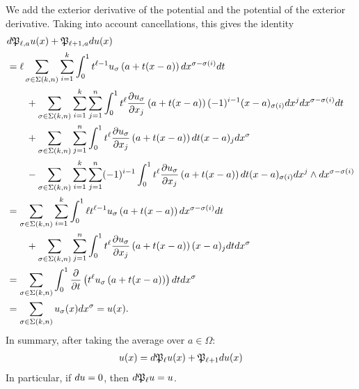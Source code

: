 \documentclass[12pt,a4paper]{article}
\begin{document}
We add the exterior derivative of the potential and the potential of the exterior derivative.
Taking into account cancellations, this gives the identity 
\begin{align*}
    &
    d {\mathfrak P}_{\ell,a} u(x)
    +
    {\mathfrak P}_{\ell+1,a} d u(x)
    \\&
    =
    \ell
    \sum_{\sigma \in \Sigma(k,n)} \sum_{i=1}^{k}
    \int_{0}^{1} 
    t^{\ell-1} u_{\sigma}\left(a+t(x-a)\right) dx^{\sigma-\sigma(i)} dt 
    \\&\qquad
    + 
    \sum_{\sigma \in \Sigma(k,n)} \sum_{i=1}^{k} \sum_{j=1}^{n}
    \int_{0}^{1} 
    t^{\ell} \frac{ \partial u_{\sigma} }{\partial x_{j}}\left(a+t(x-a)\right) (-1)^{i-1} (x-a)_{\sigma(i) } dx^{j} dx^{\sigma-\sigma(i)} dt 
    \\&\qquad
    +
    \sum_{\sigma \in \Sigma(k,n)} \sum_{j=1}^{n}
    \int_{0}^{1} t^{\ell} \frac{ \partial u_{\sigma} }{\partial x_{j}}\left(a+t(x-a)\right) dt (x-a)_{j}
    dx^{\sigma}
    \\&\qquad
    - 
    \sum_{\sigma \in \Sigma(k,n)} \sum_{i=1}^{k} \sum_{j=1}^{n}
    (-1)^{i-1}
    \int_{0}^{1} t^{\ell} \frac{ \partial u_{\sigma} }{\partial x_{j}}\left(a+t(x-a)\right) dt 
    (x-a)_{\sigma(i)} dx^{j} \wedge dx^{\sigma-\sigma(i)}
    \\&
    =
    \sum_{\sigma \in \Sigma(k,n)} \sum_{i=1}^{k}
    \int_{0}^{1} 
    \ell t^{\ell-1} u_{\sigma}\left(a+t(x-a)\right) dx^{\sigma-\sigma(i)} dt 
    \\&\qquad
    +
    \sum_{\sigma \in \Sigma(k,n)} \sum_{j=1}^{n}
    \int_{0}^{1} t^{\ell} \frac{ \partial u_{\sigma} }{\partial x_{j}}\left(a+t(x-a)\right) (x-a)_{j} dt
    dx^{\sigma}
    \\&
    =
    \sum_{\sigma \in \Sigma(k,n)} 
    \int_{0}^{1} \frac{\partial}{\partial t} \left( t^{\ell} u_{\sigma}\left(a+t(x-a)\right) \right) dt dx^{\sigma}
    \\&
    =
    \sum_{\sigma \in \Sigma(k,n)} 
    u_{\sigma}(x) dx^{\sigma}
    =
    u(x)
    .
\end{align*}
In summary, after taking the average over $a \in \Omega$:
\begin{align*}
    u(x) = d {\mathfrak P}_{\ell} u(x) + {\mathfrak P}_{\ell+1} d u(x)
\end{align*}
In particular, if $d u = 0$, then $d {\mathfrak P}_{\ell} u = u$.
\end{document}
